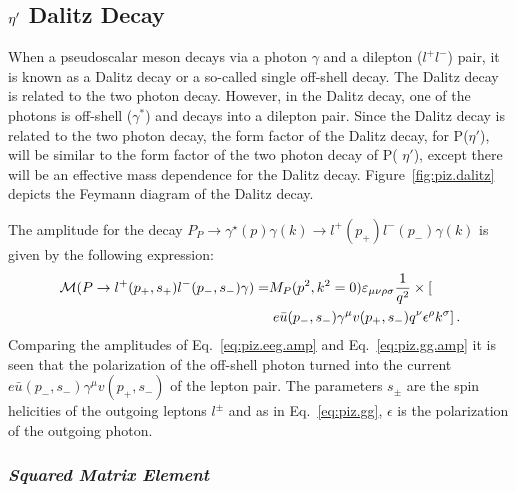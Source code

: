 \subsection{$\eta^{\prime}$ Dalitz Decay}\label{sec:dalitzdecay} 
When a pseudoscalar meson decays via a photon $\gamma$ and a dilepton ($l^{+}l^{-}$) pair, it is known as a Dalitz decay or a so-called single off-shell decay. The Dalitz decay is related to the two photon decay. However, in the Dalitz decay, one of the photons is off-shell ($\gamma^*$) and decays into a dilepton pair. Since the Dalitz decay is related to the two photon decay, the form factor of the Dalitz decay, for P($\eta'$), will be similar to the form factor of the two photon decay of P( $\eta'$), except there will be an effective mass dependence for the Dalitz decay. Figure~\ref{fig:piz.dalitz} depicts the Feymann diagram of the Dalitz decay.

The amplitude for the decay $P_P \to \gamma^\star(p) \gamma(k) \to l^+(p_+)l^-(p_-) \gamma(k)$ is given by the following expression:
\begin{align}\label{eq:piz.eeg.amp}
{\cal M}(P\to l^+(p_+,s_+)l^-(p_-,s_-) \gamma) = &{M}_P(p^2,k^2=0) \varepsilon_{\mu\nu\rho\sigma} \frac{1}{q^2} \nonumber \times \left[\right. \\ 
&\left. e \bar u(p_-,s_-) \gamma^\mu v(p_+,s_-) q^\nu \epsilon^\rho k^\sigma \right] .
\end{align}
Comparing the amplitudes of Eq.~\ref{eq:piz.eeg.amp} and Eq.~\ref{eq:piz.gg.amp} it is seen that the polarization of the off-shell photon turned into the current $e \bar u(p_-,s_-) \gamma^\mu v(p_+,s_-)$ of the lepton pair. The parameters $s_\pm$ are the spin helicities of the outgoing leptons $l^\pm$ and as in  Eq.~\ref{eq:piz.gg}, $\epsilon$ is the polarization of the outgoing photon. 
%
\subsubsection{\emph{Squared Matrix Element}}


